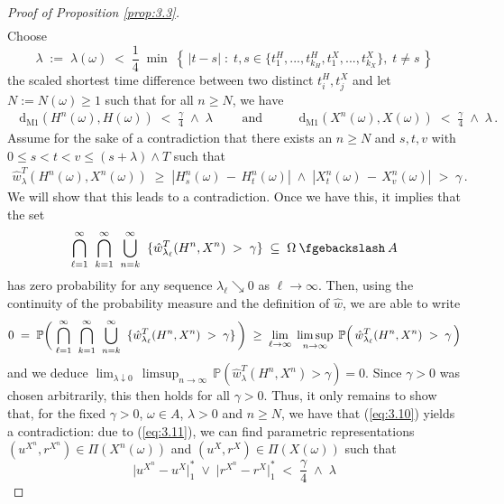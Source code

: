 \documentclass[11pt]{article}
\theoremstyle{definition}\newtheorem{example}[theorem]{Example}
\theoremstyle{definition}\newtheorem{counterexample}[theorem]{Counterexample}
\theoremstyle{definition}\newtheorem{remark}[theorem]{Remark}
\theoremstyle{definition}\newtheorem{defi}[theorem]{Definition}
\numberwithin{equation}{section}
\newcommand*\diff{\mathop{}\!\mathrm{d}}								%
\newcommand{\Pro}{\mathbb{P}}										%
\renewcommand{\min}[1]{\underset{#1}{\operatorname{min}}\;}					%
\renewcommand{\setminus}{\mathbin{\fgebackslash}}						%
\newcommand{\union}[2]{\overset{#2}{\bigcup\limits_{#1}}\;}					%
\newcommand{\intersection}[2]{\overset{#2}{\bigcap\limits_{#1}}\;}				%
\renewcommand{\|}{\; : \, \;}											%
\newcommand{\dM}{\diff_{\operatorname{M1}}}							%
\begin{document}
\begin{proof}[Proof of Proposition \ref{prop:3.3}]
\begin{align}
	\end{align}
	Choose
	$$ \lambda \; := \; \lambda(\omega) \; < \; \frac14 \; \min{} \left\{ \, |t-s| \; : \; t,s \in \{t^H_1,...,t^H_{k_H}, t^X_1,...,t^X_{k_X}\},\; t\neq s \, \right\}$$
	the scaled shortest time difference between two distinct $t_i^H, t_j^X$ and let $N:=N(\omega) \ge 1$ such that for all $n\ge N$, we have
	\begin{align} \dM\left(H^n(\omega), H(\omega)\right) \; < \; \frac \gamma 4 \; \wedge \; \lambda \qquad \text{ and } \qquad \dM\left(X^n(\omega), X(\omega)\right) \; < \; \frac \gamma 4 \; \wedge \; \lambda  \,. \label{eq:3.11}\end{align}
	Assume for the sake of a contradiction that there exists an $n\ge N$ and $s,t,v$ with $0\le s <t < v\le (s+\lambda)\wedge T$ such that
	\begin{align}
		\hat{w}^T_{\lambda}(H^n(\omega), X^n(\omega)) \; \ge \; |H^n_s(\omega) \, - \, H^n_t(\omega)| \; \wedge \;  |X^n_t(\omega) \, - \, X^n_v(\omega)| \; > \; \gamma \, .\label{eq:3.10}
	\end{align}
	We will show that this leads to a contradiction. Once we have this, it implies that the set 
	$$  \intersection{\ell = 1}{\infty} \; \intersection{k =1}{\infty} \; \union{n=k}{\infty} \; \{ \hat{w}^T_{\lambda_\ell}(H^n, X^n) \; > \; \gamma\} \; \subseteq \; \Omega \setminus A$$
	has zero probability for any sequence $\lambda_\ell \searrow 0$ as $\ell \to \infty$. Then, using the continuity of the probability measure and the definition of $\hat{w}$, we are able to write
	\begin{align*}
		0 \; = \; \Pro \biggl( \; \intersection{\ell = 1}{\infty} \; \intersection{k =1}{\infty} \; \union{n=k}{\infty} \; \{ \hat{w}^T_{\lambda_\ell}(H^n, X^n) \; > \; \gamma\}  \, \biggr) \; \ge \; \lim\limits_{\ell \to \infty} \; \limsup\limits_{n\to \infty} \;\Pro \Bigl( \, \hat{w}^T_{\lambda_\ell}(H^n, X^n) \; > \; \gamma   \, \Bigr)
	\end{align*}
	and we deduce $\lim_{\lambda \downarrow 0} \,\limsup_{n\to \infty} \,\Pro ( \hat{w}^T_{\lambda}(H^n, X^n)  >  \gamma )  = 0 $. Since $\gamma>0$ was chosen arbitrarily, this then holds for all $\gamma>0$. Thus, it only remains to show that, for the fixed $\gamma>0$, $\omega \in A$, $\lambda>0$ and $n\ge N$, we have that (\ref{eq:3.10}) yields a contradiction: due to (\ref{eq:3.11}), we can find parametric representations $(u^{X^n}, r^{X^n}) \in \Pi(X^n(\omega))$ and $(u^X, r^X) \in \Pi(X(\omega))$ such that 
	$$ \bigl|u^{X^n} - u^X\bigr|^*_1 \; \vee \;  \bigl|r^{X^n} - r^X\bigr|^*_1 \; < \; \frac \gamma 4 \; \wedge \; \lambda$$

\end{proof}
\end{document}

